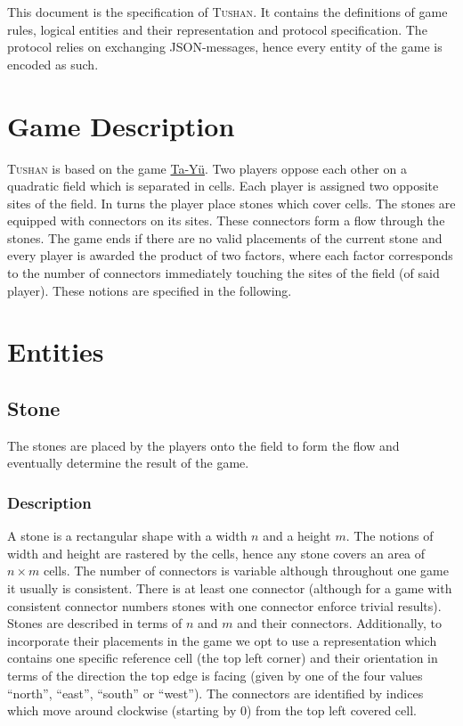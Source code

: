 \documentclass{scrartcl}
\title{\tushan{}}
\newcommand{\tushan}{\textsc{Tushan}}
\begin{document}
\maketitle

This document is the specification of \tushan{}. It contains the 
definitions of game rules, logical entities and their representation and 
protocol specification. The protocol relies on exchanging JSON-messages, hence
every entity of the game is encoded as such.

\section{Game Description}
\tushan{} is based on the game 
\href{https://en.wikipedia.org/wiki/Ta\_Y\%C3\%BC}{Ta-Yü}. Two players
oppose each other on a quadratic field which is separated in cells. Each player 
is assigned two opposite sites of the field. In turns the player place stones
which cover cells. The stones are equipped with connectors on its sites. These
connectors form a flow through the stones. The game ends if there are no valid
placements of the current stone and every player is awarded the product of two
factors, where each factor corresponds to the number of connectors immediately
touching the sites of the field (of said player). These notions are specified
in the following.

\section{Entities}
\subsection{Stone}
The stones are placed by the players onto the field to form the flow and 
eventually determine the result of the game.
\subsubsection{Description}
A stone is a rectangular shape with a width $n$ and a height $m$. The notions 
of width and height are rastered by the cells, hence any stone covers an area
of $n\times m$ cells. The number of connectors is variable although throughout 
one game it usually is consistent. There is at least one connector (although 
for a game with consistent connector numbers stones with one connector enforce 
trivial results). Stones are described in terms of $n$ and $m$ and their 
connectors. Additionally, to incorporate their placements in the game we opt to 
use a representation which contains one specific reference cell (the top left
corner) and their orientation in terms of the direction the top edge is facing
(given by one of the four values \enquote{north}, \enquote{east}, 
\enquote{south} or \enquote{west}). The connectors are identified by indices 
which move around clockwise (starting by $0$) from the top left covered cell.
\end{document}
